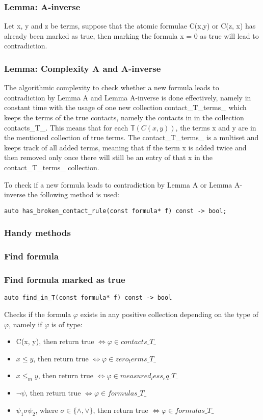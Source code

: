 \documentclass{article}
\begin{document}
			\subsubsection*{Lemma: A-inverse}
				Let x, y and z be terms, suppose that the atomic formulae C(x,y) or C(z, x) has already been marked as true,
				then marking the formula x = 0 as true will lead to contradiction.
				
			\subsubsection*{Lemma: Complexity A and A-inverse} 
				The algorithmic complexity to check whether a new formula leads to contradiction by Lemma A and Lemma A-inverse is done
				effectively, namely in constant time with the usage of one new collection contact\_T\_terms\_ which keeps the terms of 
				the true contacts, namely the contacts in in the collection contacts\_T\_. This means that for each $\mathbb{T}(C(x, y))$, the 
				terms x and y are in the mentioned collection of true terms. The contact\_T\_terms\_  is a multiset and keeps track 
				of all added terms, meaning that if the term x is added twice and then removed only once there will still be an entry of 
				that x in the contact\_T\_terms\_ collection.
				
				To check if a new formula leads to contradiction by Lemma A or Lemma A-inverse the following method is used:
				\begin{lstlisting}
auto has_broken_contact_rule(const formula* f) const -> bool;
				\end{lstlisting}

			\subsubsection{Handy methods}
			\subsubsection*{Find formula}
			\subsubsection*{Find formula marked as true}
				\begin{lstlisting}
auto find_in_T(const formula* f) const -> bool
				\end{lstlisting}
				Checks if the formula $\varphi$ exists in any positive collection depending on the type of $\varphi$, namely
				if $\varphi$ is of type:
				\begin{itemize}
					\item C(x, y), then return true $\iff \varphi \in contacts\_T\_$
					\item $x \le y$, then return true $\iff \varphi \in zero_terms\_T\_$
					\item $x \le_m y$, then return true $\iff \varphi \in measured_less_eq\_T\_$
					\item $\neg \psi$, then return true $\iff \varphi \in formulas\_T\_$
					\item $\psi_1 \sigma \psi_2$, where $\sigma \in \{\wedge, \vee\}$, then return true $\iff \varphi \in formulas\_T\_$
				\end{itemize}
\end{document}
